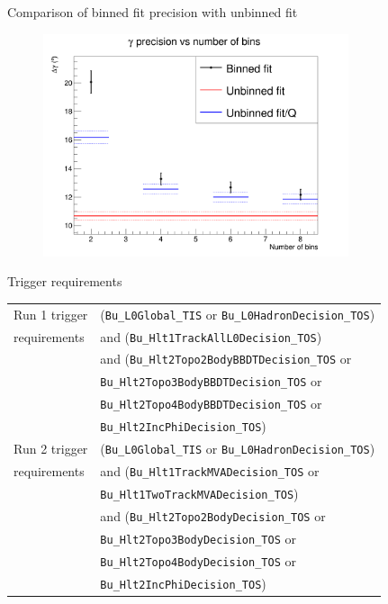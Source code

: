 \documentclass{beamer}
\begin{document}
\begin{frame}{Comparison of binned fit precision with unbinned fit}
  \begin{figure}
    \centering
    \includegraphics[width = 0.8\textwidth]{Plots/GammaPrecisionVersusBinNumber.png}
  \end{figure}
\end{frame}

\begin{frame}{Trigger requirements}
  \centering
  \def\arraystretch{1.2}%
  \begin{tabular}{|l|l|}
    \hline
    Run 1 trigger        & (\texttt{Bu\_L0Global\_TIS} or \texttt{Bu\_L0HadronDecision\_TOS}) \\
    requirements         & and (\texttt{Bu\_Hlt1TrackAllL0Decision\_TOS}) \\
                         & and (\texttt{Bu\_Hlt2Topo2BodyBBDTDecision\_TOS} or \\
                         & \texttt{Bu\_Hlt2Topo3BodyBBDTDecision\_TOS} or \\
                         & \texttt{Bu\_Hlt2Topo4BodyBBDTDecision\_TOS} or \\
                         & \texttt{Bu\_Hlt2IncPhiDecision\_TOS}) \\
    \hline
    Run 2 trigger        & (\texttt{Bu\_L0Global\_TIS} or \texttt{Bu\_L0HadronDecision\_TOS}) \\
    requirements         & and (\texttt{Bu\_Hlt1TrackMVADecision\_TOS} or \\
                         & \texttt{Bu\_Hlt1TwoTrackMVADecision\_TOS}) \\
                         & and (\texttt{Bu\_Hlt2Topo2BodyDecision\_TOS} or \\
                         & \texttt{Bu\_Hlt2Topo3BodyDecision\_TOS} or \\
                         & \texttt{Bu\_Hlt2Topo4BodyDecision\_TOS} or \\
                         & \texttt{Bu\_Hlt2IncPhiDecision\_TOS}) \\
    \hline
  \end{tabular}
\end{frame}
\end{document}
